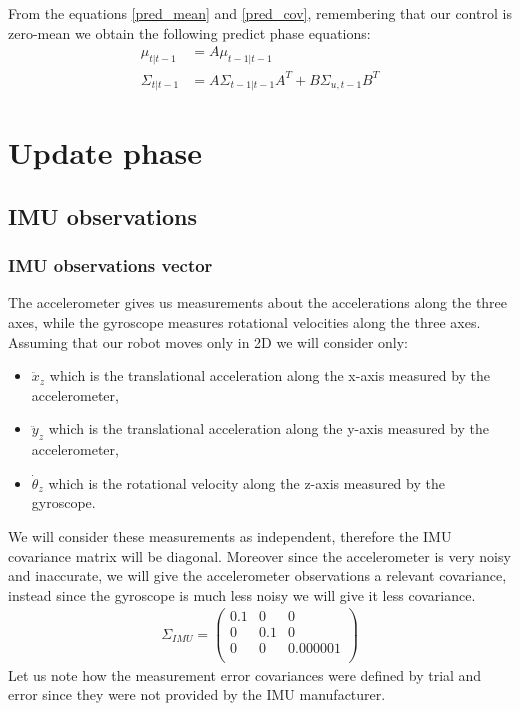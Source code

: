 From the equations \ref{pred_mean} and \ref{pred_cov}, remembering that our control is zero-mean we obtain the following predict phase equations:
\begin{align}
	\mu_{t|t-1} &= A \mu_{t-1|t-1}\\
	\Sigma_{t|t-1} &= A \Sigma_{t-1|t-1} A^T + B \Sigma_{u,t-1} B^T
\end{align}


\section{Update phase}
\subsection{IMU observations}
\subsubsection{IMU observations vector}
The accelerometer gives us measurements about the accelerations along the three axes, while the gyroscope measures rotational velocities along the three axes. Assuming that our robot moves only in 2D we will consider only:
\begin{itemize}
	\item $\ddot{x}_z$ which is the translational acceleration along the x-axis measured by the accelerometer,
	\item $\ddot{y}_z$ which is the translational acceleration along the y-axis measured by the accelerometer,
	\item $\dot{\theta}_z$ which is the rotational velocity along the z-axis measured by the gyroscope.
\end{itemize}

We will consider these measurements as independent, therefore the IMU covariance matrix will be diagonal. Moreover since the accelerometer is very noisy and inaccurate, we will give the accelerometer observations a relevant covariance, instead since the gyroscope is much less noisy we will give it less covariance.
\begin{align}
	\Sigma_{IMU} = \begin{pmatrix}
				0.1 & 0 & 0\\
				0 & 0.1 & 0\\
				0 & 0 & 0.000001\\
			\end{pmatrix}
\end{align}
Let us note how the measurement error covariances were defined by trial and error since they were not provided by the IMU manufacturer.

